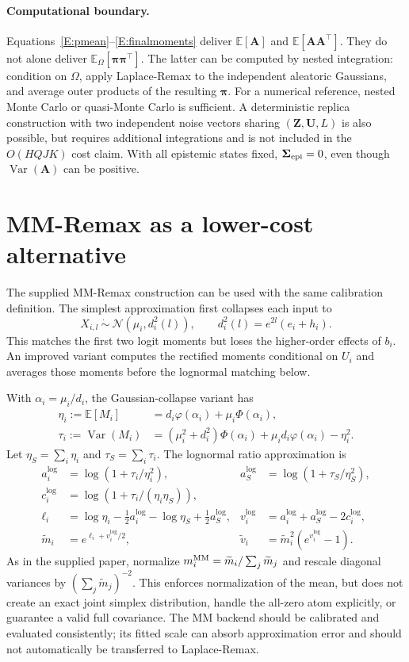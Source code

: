 \documentclass[letterpaper]{article}
\newcommand{\E}{\mathbb E}
\newcommand{\Var}{\operatorname{Var}}
\newcommand{\Normal}{\mathcal N}
\begin{document}
\paragraph{Computational boundary.}
Equations~\eqref{E:pmean}--\eqref{E:finalmoments} deliver $\E[\bm A]$ and $\E[\bm A\bm A^\intercal]$. They do not alone deliver $\E_\Omega[\bm\pi\bm\pi^\intercal]$. The latter can be computed by nested integration: condition on $\Omega$, apply Laplace-Remax to the independent aleatoric Gaussians, and average outer products of the resulting $\bm\pi$. For a numerical reference, nested Monte Carlo or quasi-Monte Carlo is sufficient. A deterministic replica construction with two independent noise vectors sharing $(\bm Z,\bm U,L)$ is also possible, but requires additional integrations and is not included in the $O(HQJK)$ cost claim. With all epistemic states fixed, $\bm\Sigma_{\rm epi}=0$, even though $\Var(\bm A)$ can be positive.

\section{MM-Remax as a lower-cost alternative}\label{S:mm}
The supplied MM-Remax construction can be used with the same calibration definition. The simplest approximation first collapses each input to
\begin{equation}
X_{i,l}\ \dot\sim\ \Normal(\mu_i,d_i^2(l)),\qquad d_i^2(l)=e^{2l}(e_i+h_i).
\label{E:mmcollapse}
\end{equation}
This matches the first two logit moments but loses the higher-order effects of $b_i$. An improved variant computes the rectified moments conditional on $U_i$ and averages those moments before the lognormal matching below.

With $\alpha_i=\mu_i/d_i$, the Gaussian-collapse variant has
\begin{align}
\eta_i:=\E[M_i]&=d_i\varphi(\alpha_i)+\mu_i\Phi(\alpha_i),\\
\tau_i:=\Var(M_i)&=(\mu_i^2+d_i^2)\Phi(\alpha_i)+\mu_i d_i\varphi(\alpha_i)-\eta_i^2.
\end{align}
Let $\eta_S=\sum_i\eta_i$ and $\tau_S=\sum_i\tau_i$. The lognormal ratio approximation is
\begin{align}
a_i^{\log}&=\log(1+\tau_i/\eta_i^2),&a_S^{\log}&=\log(1+\tau_S/\eta_S^2),\\
c_i^{\log}&=\log(1+\tau_i/(\eta_i\eta_S)),\\
\ell_i&=\log\eta_i-\tfrac12a_i^{\log}-\log\eta_S+\tfrac12a_S^{\log},&
v_i^{\log}&=a_i^{\log}+a_S^{\log}-2c_i^{\log},\\
\widetilde m_i&=e^{\ell_i+v_i^{\log}/2},&
\widetilde v_i&=\widetilde m_i^2(e^{v_i^{\log}}-1).
\end{align}
As in the supplied paper, normalize $m_i^{\rm MM}=\widetilde m_i/\sum_j\widetilde m_j$ and rescale diagonal variances by $(\sum_j\widetilde m_j)^{-2}$. This enforces normalization of the mean, but does not create an exact joint simplex distribution, handle the all-zero atom explicitly, or guarantee a valid full covariance. The MM backend should be calibrated and evaluated consistently; its fitted scale can absorb approximation error and should not automatically be transferred to Laplace-Remax.
\end{document}
